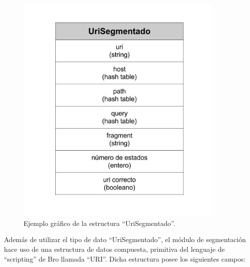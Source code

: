 \begin{figure}[!htb]
\begin{center}
\includegraphics[width=4in]{./img/UriSegmentado.jpg}
\caption{Ejemplo gráfico de la estructura ``UriSegmentado''.}
\label{fig:uriSegmentado}
\end{center}
\end{figure}

Además de utilizar el tipo de dato ``UriSegmentado'', el módulo de segmentación hace uso de una estructura de datos compuesta, primitiva del lenguaje de ``scripting'' de Bro llamada  ``URI''. Dicha estructura posee los siguientes campos:

